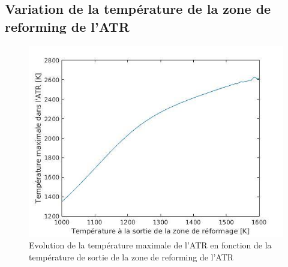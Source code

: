 \documentclass[12pt]{report}
\begin{document}
\subsection{Variation de la température de la zone de reforming de l'ATR}

\begin{figure}[H]
\begin{center}
\includegraphics[scale=0.6]{Tmax_Tsortie}
\caption{Evolution de la température maximale de l'ATR en fonction de la température de sortie de la zone de reforming de l'ATR}
\end{center}
\end{figure}
\end{document}
